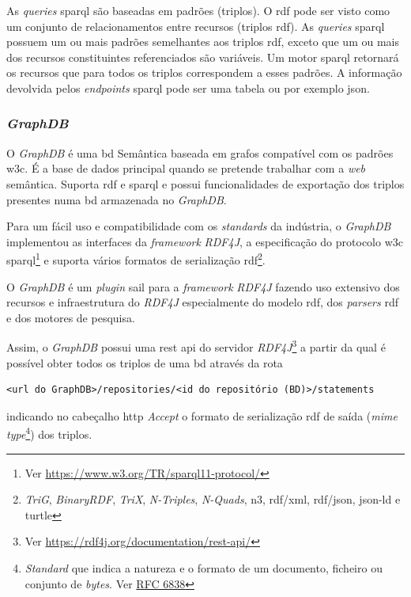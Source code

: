 As \textit{queries} \acrshort{sparql} são baseadas em padrões (triplos). O \acrshort{rdf} pode ser visto como um conjunto de relacionamentos entre recursos (triplos \acrshort{rdf}). As \textit{queries} \acrshort{sparql} possuem um ou mais padrões semelhantes aos triplos \acrshort{rdf}, exceto que um ou mais dos recursos constituintes referenciados são variáveis. Um motor \acrshort{sparql} retornará os recursos que para todos os triplos correspondem a esses padrões. A informação devolvida pelos \textit{endpoints} \acrshort{sparql} pode ser uma tabela ou por exemplo \acrshort{json}.

\subsubsection{\textit{GraphDB}}

O \textit{GraphDB} é uma \acrfull{bd} Semântica baseada em grafos compatível com os padrões \acrshort{w3c}. É a base de dados principal quando se pretende trabalhar com a \textit{web} semântica. Suporta \acrshort{rdf} e \acrshort{sparql} e possui funcionalidades de exportação dos triplos presentes numa \acrshort{bd} armazenada no \textit{GraphDB}.

Para um fácil uso e compatibilidade com os \textit{standards} da indústria, o \textit{GraphDB} implementou as interfaces da \textit{framework} \textit{RDF4J}, a especificação do protocolo \acrshort{w3c} \acrshort{sparql}\footnote{Ver \url{https://www.w3.org/TR/sparql11-protocol/}} e suporta vários formatos de serialização \acrshort{rdf}\footnote{\label{fnRDF}\textit{TriG}, \textit{BinaryRDF}, \textit{TriX}, \textit{N-Triples}, \textit{N-Quads}, \acrshort{n3}, \acrshort{rdf}/\acrshort{xml}, \acrshort{rdf}/\acrshort{json}, \acrshort{json-ld} e \acrshort{turtle}}.~\cite{graphdbAbout}

O \textit{GraphDB} é um \textit{plugin} \acrshort{sail} para a \textit{framework} \textit{RDF4J} fazendo uso extensivo dos recursos e infraestrutura do \textit{RDF4J} especialmente do modelo \acrshort{rdf}, dos \textit{parsers} \acrshort{rdf} e dos motores de pesquisa.~\cite{graphdbArch}

Assim, o \textit{GraphDB} possui uma \acrshort{rest} \acrshort{api} do servidor \textit{RDF4J}\footnote{Ver \url{https://rdf4j.org/documentation/rest-api/}} a partir da qual é possível obter todos os triplos de uma \acrshort{bd} através da rota
\begin{verbatim}
<url do GraphDB>/repositories/<id do repositório (BD)>/statements
\end{verbatim}
indicando no cabeçalho \acrshort{http} \textit{Accept} o formato de serialização \acrshort{rdf} de saída (\textit{\acrshort{mime} type}\footnote{\textit{Standard} que indica a natureza e o formato de um documento, ficheiro ou conjunto de \textit{bytes}. Ver \href{https://tools.ietf.org/html/rfc6838}{RFC 6838}}) dos triplos.

